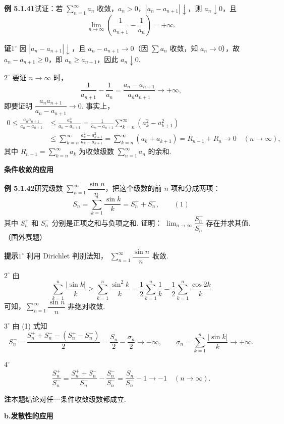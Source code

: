\documentclass[UTF8,12pt,a4paper,fontset=fandol]{ctexart}
\begin{document}
\noindent\textbf{例 5.1.41}\quad 试证：若 $\displaystyle\sum_{n=1}^{\infty}a_n$ 收敛，$a_n>0$，$|a_n-a_{n+1}|\downarrow$，则 $a_n\downarrow0$，且
\[
  \lim_{n\to\infty}\left(\frac1{a_{n+1}}-\frac1{a_n}\right)=+\infty.
\]

\noindent\textbf{证}\quad $1^\circ$ 因 $|a_n-a_{n+1}|\downarrow$，且 $a_n-a_{n+1}\to0$（因 $\sum a_n$ 收敛，知 $a_n\to0$），故 $a_n-a_{n+1}\ge0$，即 $a_n\ge a_{n+1}$，因此 $a_n\downarrow0$.

$2^\circ$ 要证 $n\to\infty$ 时，
\[
  \frac1{a_{n+1}}-\frac1{a_n}
  =\frac{a_n-a_{n+1}}{a_na_{n+1}}\to+\infty,
\]
即要证明 $\dfrac{a_na_{n+1}}{a_n-a_{n+1}}\to0$. 事实上，
\[
\begin{aligned}
0\le\frac{a_na_{n+1}}{a_n-a_{n+1}}
&\le\frac{a_n^2}{a_n-a_{n+1}}
=\frac1{a_n-a_{n+1}}\sum_{k=n}^{\infty}(a_k^2-a_{k+1}^2)\\
&\le\sum_{k=n}^{\infty}\frac{a_k^2-a_{k+1}^2}{a_k-a_{k+1}}
=\sum_{k=n}^{\infty}(a_k+a_{k+1})
=R_{n-1}+R_n\to0\quad(n\to\infty),
\end{aligned}
\]
其中 $R_{n-1}=\displaystyle\sum_{k=n}^{\infty}a_k$ 为收敛级数
$\displaystyle\sum_{n=1}^{\infty}a_n$ 的余和.

\noindent\textbf{条件收敛的应用}

\noindent\textbf{例 5.1.42}\quad 研究级数
$\displaystyle\sum_{n=1}^{\infty}\dfrac{\sin n}{n}$，把这个级数的前 $n$ 项和分成两项：
\[
  S_n=\sum_{k=1}^n\frac{\sin k}{k}=S_n^++S_n^-,
\qquad(1)
\]
其中 $S_n^+$ 和 $S_n^-$ 分别是正项之和与负项之和. 证明：
$\displaystyle\lim_{n\to\infty}\dfrac{S_n^+}{S_n^-}$ 存在并求其值.（国外赛题）

\noindent\textbf{提示}\quad $1^\circ$ 利用 Dirichlet 判别法知，
$\displaystyle\sum_{n=1}^{\infty}\dfrac{\sin n}{n}$ 收敛.

$2^\circ$ 由
\[
  \sum_{k=1}^n\frac{|\sin k|}{k}
  \ge\sum_{k=1}^n\frac{\sin^2 k}{k}
  =\frac12\sum_{k=1}^n\frac1k-\frac12\sum_{k=1}^n\frac{\cos2k}{k}
\]
可知，$\displaystyle\sum_{n=1}^{\infty}\dfrac{\sin n}{n}$ 非绝对收敛.

$3^\circ$ 由 (1) 式知
\[
  S_n^-=\frac{S_n^++S_n^--(S_n^+-S_n^-)}2
  =\frac{S_n}2-\frac{\sigma_n}2\to-\infty,
  \qquad \sigma_n=\sum_{k=1}^n\frac{|\sin k|}{k}\to+\infty.
\]

$4^\circ$
\[
  \frac{S_n^+}{S_n^-}
  =\frac{S_n^++S_n^-}{S_n^-}-\frac{S_n^-}{S_n^-}
  =\frac{S_n}{S_n^-}-1\to-1\quad(n\to\infty).
\]

\noindent\textbf{注}\quad 本题结论对任一条件收敛级数都成立.

\noindent\textbf{b.\quad 发散性的应用}
\end{document}
